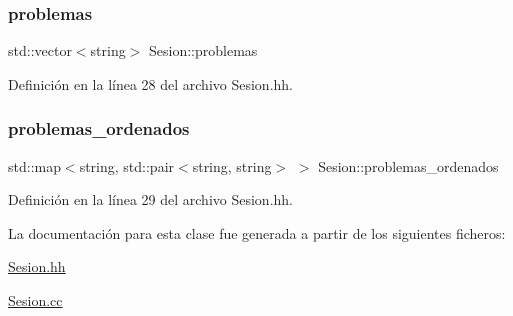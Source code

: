 \subsubsection{\texorpdfstring{problemas}{problemas}}
{\footnotesize\ttfamily std\+::vector$<$string$>$ Sesion\+::problemas\hspace{0.3cm}{\ttfamily [private]}}



Definición en la línea 28 del archivo Sesion.\+hh.

\mbox{\label{class_sesion_a4f770d029f7be9368a3abec6af7e8de7}} 
\subsubsection{\texorpdfstring{problemas\+\_\+ordenados}{problemas\_ordenados}}
{\footnotesize\ttfamily std\+::map$<$string, std\+::pair$<$string, string$>$ $>$ Sesion\+::problemas\+\_\+ordenados\hspace{0.3cm}{\ttfamily [private]}}



Definición en la línea 29 del archivo Sesion.\+hh.



La documentación para esta clase fue generada a partir de los siguientes ficheros\+:\begin{DoxyCompactItemize}
\item 
\mbox{\hyperlink{_sesion_8hh}{Sesion.\+hh}}\item 
\mbox{\hyperlink{_sesion_8cc}{Sesion.\+cc}}\end{DoxyCompactItemize}
